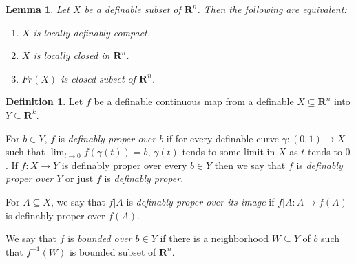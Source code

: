 \documentclass{amsart}
\newtheorem{lemma}[theorem]{Lemma}
\theoremstyle{definition}
\newtheorem{definition}[theorem]{Definition}
\numberwithin{equation}{section}
\begin{document}
\begin{lemma}
	Let $X$ be a definable subset of $\mathbf{R}^n$.
	Then the following are equivalent:
	\begin{enumerate}[label = {(\roman*)}]
		\item $X$ is locally definably compact.
		\item $X$ is locally closed in $\mathbf{R}^n$.
		\item $Fr(X)$ is closed subset of $\mathbf{R}^n$.
	\end{enumerate}
\end{lemma}

\begin{definition}
	Let $f$ be a definable continuous map from a definable $X \subseteq \mathbf{R}^n$ into $Y \subseteq \mathbf{R}^k$.

	For $b \in Y$, $f$ is \emph{definably proper over $b$} if for every definable curve $\gamma:(0,1) \to X$ such that $\lim_{t\to 0} f(\gamma(t)) = b$,
	$\gamma(t)$ tends to some limit in $X$ as $t$ tends to $0$.
	If $f: X \to Y$ is definably proper over every $b\in Y$ then
	we say that $f$ is \emph{definably proper over $Y$} or just
	$f$ is \emph{definably proper}.

	For $A \subseteq X$, we say that $f|A$ is \emph{definably proper over its image} if $f|A : A \to f(A)$ is definably proper over $f(A)$.

	We say that $f$ is \emph{bounded over $b\in Y$} if there is a neighborhood $W \subseteq Y$ of $b$ such that $f^{-1}(W)$ is bounded subset of $\mathbf{R}^n$.
\end{definition}


\end{document}
